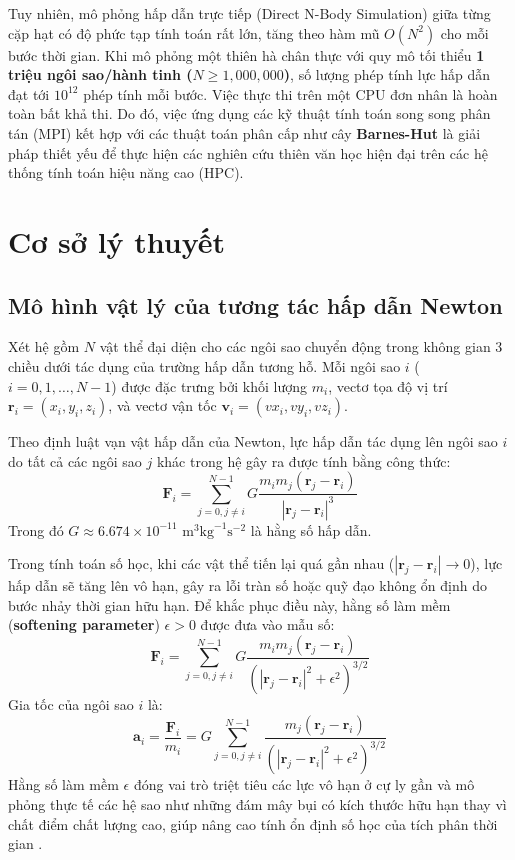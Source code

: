 \documentclass[12pt]{article}
\begin{document}
Tuy nhiên, mô phỏng hấp dẫn trực tiếp (Direct N-Body Simulation) giữa từng cặp hạt có độ phức tạp tính toán rất lớn, tăng theo hàm mũ $O(N^2)$ cho mỗi bước thời gian. Khi mô phỏng một thiên hà chân thực với quy mô tối thiểu \textbf{1 triệu ngôi sao/hành tinh ($N \ge 1,000,000$)}, số lượng phép tính lực hấp dẫn đạt tới $10^{12}$ phép tính mỗi bước. Việc thực thi trên một CPU đơn nhân là hoàn toàn bất khả thi. Do đó, việc ứng dụng các kỹ thuật tính toán song song phân tán (MPI) kết hợp với các thuật toán phân cấp như cây \textbf{Barnes-Hut} là giải pháp thiết yếu để thực hiện các nghiên cứu thiên văn học hiện đại trên các hệ thống tính toán hiệu năng cao (HPC).

\section{Cơ sở lý thuyết}
\label{sec:theory}

\subsection{Mô hình vật lý của tương tác hấp dẫn Newton}
Xét hệ gồm $N$ vật thể đại diện cho các ngôi sao chuyển động trong không gian 3 chiều dưới tác dụng của trường hấp dẫn tương hỗ. Mỗi ngôi sao $i$ ($i = 0, 1, \dots, N-1$) được đặc trưng bởi khối lượng $m_i$, vectơ tọa độ vị trí $\mathbf{r}_i = (x_i, y_i, z_i)$, và vectơ vận tốc $\mathbf{v}_i = (vx_i, vy_i, vz_i)$.

Theo định luật vạn vật hấp dẫn của Newton, lực hấp dẫn tác dụng lên ngôi sao $i$ do tất cả các ngôi sao $j$ khác trong hệ gây ra được tính bằng công thức:
\begin{equation}
\mathbf{F}_i = \sum_{j=0, j \neq i}^{N-1} G \frac{m_i m_j (\mathbf{r}_j - \mathbf{r}_i)}{|\mathbf{r}_j - \mathbf{r}_i|^3}
\end{equation}
Trong đó $G \approx 6.674 \times 10^{-11} \text{ m}^3\text{kg}^{-1}\text{s}^{-2}$ là hằng số hấp dẫn.

Trong tính toán số học, khi các vật thể tiến lại quá gần nhau ($|\mathbf{r}_j - \mathbf{r}_i| \to 0$), lực hấp dẫn sẽ tăng lên vô hạn, gây ra lỗi tràn số hoặc quỹ đạo không ổn định do bước nhảy thời gian hữu hạn. Để khắc phục điều này, hằng số làm mềm (\textbf{softening parameter}) $\epsilon > 0$ được đưa vào mẫu số:
\begin{equation}
\mathbf{F}_i = \sum_{j=0, j \neq i}^{N-1} G \frac{m_i m_j (\mathbf{r}_j - \mathbf{r}_i)}{(|\mathbf{r}_j - \mathbf{r}_i|^2 + \epsilon^2)^{3/2}}
\end{equation}
Gia tốc của ngôi sao $i$ là:
\begin{equation}
\mathbf{a}_i = \frac{\mathbf{F}_i}{m_i} = G \sum_{j=0, j \neq i}^{N-1} \frac{m_j (\mathbf{r}_j - \mathbf{r}_i)}{(|\mathbf{r}_j - \mathbf{r}_i|^2 + \epsilon^2)^{3/2}}
\end{equation}
Hằng số làm mềm $\epsilon$ đóng vai trò triệt tiêu các lực vô hạn ở cự ly gần và mô phỏng thực tế các hệ sao như những đám mây bụi có kích thước hữu hạn thay vì chất điểm chất lượng cao, giúp nâng cao tính ổn định số học của tích phân thời gian \cite{trenti2008}.
\end{document}
